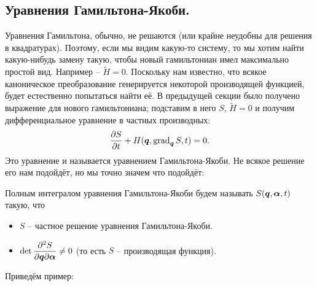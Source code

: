 \subsection{Уравнения Гамильтона-Якоби.}
Уравнения Гамильтона, обычно, не решаются (или крайне неудобны для решения в квадратурах).
Поэтому, если мы видим какую-то систему, то мы хотим найти какую-нибудь замену такую, чтобы новый гамильтониан имел максимально простой вид.
Например -- $\tilde{H} = 0$.
Поскольку нам известно, что всякое каноническое преобразование генерируется некоторой производящей функцией, будет естественно попытаться найти её.
В предыдущей секции было получено выражение для нового гамильтониана; подставим в него $S$, $\tilde{H} = 0$ и получим дифференциальное уравнение в частных производных:
\[
    \dfrac{\partial S}{\partial t} + H(\boldsymbol{q}, \operatorname{grad}_{\boldsymbol{q}} S, t) = 0.
\]
Это уравнение и называется уравнением Гамильтона-Якоби.
Не всякое решение его нам подойдёт, но мы точно значем что подойдёт:
\begin{definition}
    Полным интегралом уравнения Гамильтона-Якоби будем называть $S(\boldsymbol{q}, \boldsymbol{\alpha}, t)$ такую, что
    \begin{itemize}
        \item $S$ -- частное решение уравнения Гамильтона-Якоби.
        \item $\det \dfrac{\partial^2 S}{\partial \boldsymbol{q} \partial \boldsymbol{\alpha}} \neq 0$ (то есть $S$ -- производящая функция).
    \end{itemize}
\end{definition}
Приведём пример:
